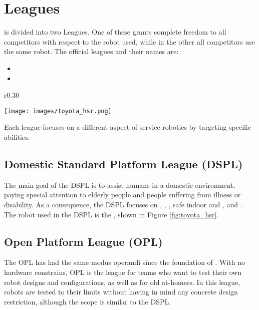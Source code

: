 \section{Leagues}
\label{sec:leagues}

\AtHome{} is divided into two Leagues. One of these grants complete freedom to all competitors with respect to the robot used, while in the other all competitors use the same robot. The official leagues and their names are:
\begin{itemize}
  \item \OPL
  \item \DSPL
\end{itemize}

\begin{wrapfigure}[21]{r}{0.30\textwidth}
	\vspace{-30pt}
	\begin{center}
		\texttt{[image: images/toyota\_hsr.png]}
		\vspace{-10pt}
		\caption{Toyota HSR}
		\label{fig:toyota_hsr}
	\end{center}
\end{wrapfigure}
Each league focuses on a different aspect of service robotics by targeting specific abilities.

\subsection{Domestic Standard Platform League (DSPL)}

The main goal of the DSPL is to assist humans in a domestic environment, paying special attention to elderly people and people suffering from illness or disability.
As a consequence, the DSPL focuses on \AmI, \CV, \OM, safe indoor \NAV{} and \MAP, and \TP.
The robot used in the DSPL is the \HSR, shown in Figure \ref{fig:toyota_hsr}.

\subsection{Open Platform League (OPL)}

The OPL has had the same modus operandi since the foundation of \AtHome.
With no hardware constrains, OPL is the league for teams who want to test their own robot designs and configurations, as well as for old at-homers.
In this league, robots are tested to their limits without having in mind any concrete design restriction, although the scope is similar to the DSPL.
